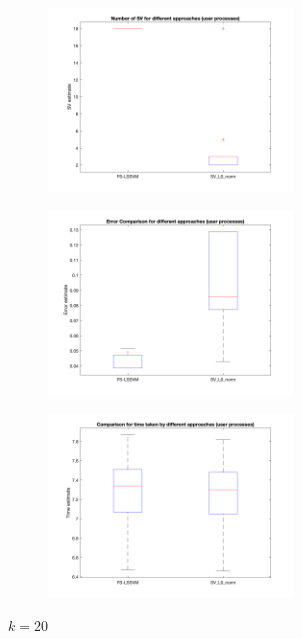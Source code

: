 \documentclass[a4paper, 11pt, one column]{article}
\begin{document}
\begin{figure}[H]
		\begin{subfigure}{0.33\textwidth}
            \includegraphics[width=6.5cm]{images/comp_SV_k=20_shuttle.png}
            \label{fig:4}
        \end{subfigure}\hfil
        \begin{subfigure}{0.33\textwidth}
            \includegraphics[width=6.5cm]{images/comp_error_k=20_shuttle.png}
            \label{fig:5}
        \end{subfigure}\hfil
        \begin{subfigure}{0.33\textwidth}
            \includegraphics[width=6.5cm]{images/comp_time_k=20_shuttle.png}
            \label{fig:6}
        \end{subfigure}\hfil
        \caption{$k = 20$}
        \label{fig:comparisonL033}
\end{figure}
\end{document}
